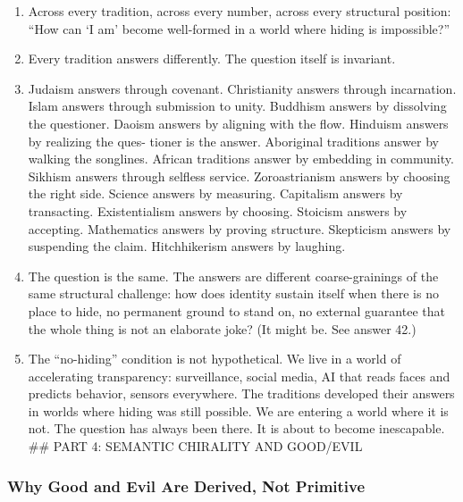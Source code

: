 \documentclass[
]{article}
\providecommand{\tightlist}{%
  \setlength{\itemsep}{0pt}\setlength{\parskip}{0pt}}
\begin{document}
\begin{enumerate}
\def\labelenumi{\arabic{enumi}.}
\setcounter{enumi}{177}
\tightlist
\item
  Across every tradition, across every number, across every structural
  position: ``How can `I am' become well-formed in a world where hiding
  is impossible?''
\item
  Every tradition answers differently. The question itself is invariant.
\item
  Judaism answers through covenant. Christianity answers through
  incarnation. Islam answers through submission to unity. Buddhism
  answers by dissolving the questioner. Daoism answers by aligning with
  the flow. Hinduism answers by realizing the ques- tioner is the
  answer. Aboriginal traditions answer by walking the songlines. African
  traditions answer by embedding in community. Sikhism answers through
  selfless service. Zoroastrianism answers by choosing the right side.
  Science answers by measuring. Capitalism answers by transacting.
  Existentialism answers by choosing. Stoicism answers by accepting.
  Mathematics answers by proving structure. Skepticism answers by
  suspending the claim. Hitchhikerism answers by laughing.
\item
  The question is the same. The answers are different coarse-grainings
  of the same structural challenge: how does identity sustain itself
  when there is no place to hide, no permanent ground to stand on, no
  external guarantee that the whole thing is not an elaborate joke? (It
  might be. See answer 42.)
\item
  The ``no-hiding'' condition is not hypothetical. We live in a world of
  accelerating transparency: surveillance, social media, AI that reads
  faces and predicts behavior, sensors everywhere. The traditions
  developed their answers in worlds where hiding was still possible. We
  are entering a world where it is not. The question has always been
  there. It is about to become inescapable. \#\# PART 4: SEMANTIC
  CHIRALITY AND GOOD/EVIL
\end{enumerate}

\subsubsection{Why Good and Evil Are Derived, Not
Primitive}\label{why-good-and-evil-are-derived-not-primitive}
\end{document}
